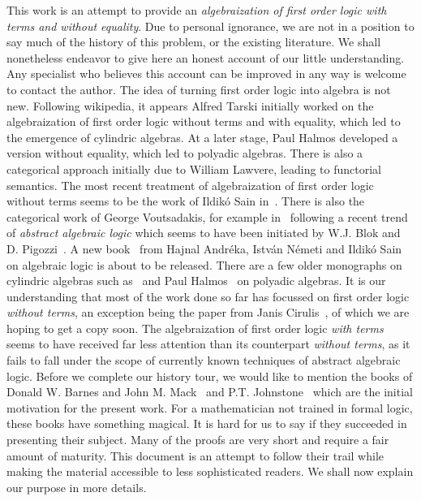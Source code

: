 This work is an attempt to provide an {\em algebraization of first
order logic with terms and without equality}. Due to personal
ignorance, we are not in a position to say much of the history of
this problem, or the existing literature. We shall nonetheless
endeavor to give here an honest account of our little understanding.
Any specialist who believes this account can be improved in any way
is welcome to contact the author. The idea of turning first order
logic into algebra is not new. Following wikipedia, it appears
Alfred Tarski initially worked on the algebraization of first order
logic without terms and with equality, which led to the emergence of
cylindric algebras. At a later stage, Paul Halmos developed a
version without equality, which led to polyadic algebras. There is
also a categorical approach initially due to William Lawvere,
leading to functorial semantics. The most recent treatment of
algebraization of first order logic without terms seems to be the
work of Ildik\'o Sain in~\cite{Sain}. There is also the categorical
work of George Voutsadakis, for example in~\cite{Voutsadakis}
following a recent trend of {\em abstract algebraic logic} which
seems to have been initiated by W.J. Blok and D.
Pigozzi~\cite{BlokPigozzi}. A new book~\cite{AndrekaNemeti} from
Hajnal Andr\'eka, Istv\'an N\'emeti and Ildik\'o Sain on algebraic
logic is about to be released. There are a few older monographs on
cylindric algebras such as~\cite{Cylindric} and Paul
Halmos~\cite{Halmos} on polyadic algebras. It is our understanding
that most of the work done so far has focussed on first order logic
{\em without terms}, an exception being the paper from Janis
Cirulis~\cite{Cirulis}, of which we are hoping to get a copy soon.
The algebraization of first order logic {\em with terms} seems to
have received far less attention than its counterpart {\em without
terms}, as it fails to fall under the scope of currently known
techniques of abstract algebraic logic. Before we complete our
history tour, we would like to mention the books of Donald W. Barnes
and John M. Mack~\cite{AlgLog} and P.T. Johnstone~\cite{Johnstone}
which are the initial motivation for the present work. For a
mathematician not trained in formal logic, these books have
something magical. It is hard for us to say if they succeeded in
presenting their subject. Many of the proofs are very short and
require a fair amount of maturity. This document is an attempt to
follow their trail while making the material accessible to less
sophisticated readers. We shall now explain our purpose in more
details.

